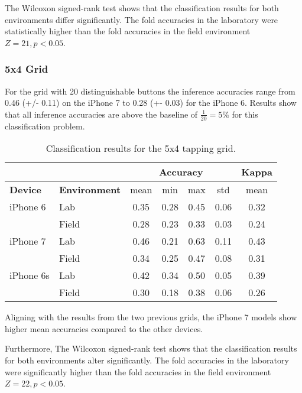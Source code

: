 The Wilcoxon signed-rank test shows that the classification results for both environments differ significantly. The fold accuracies in the laboratory were statistically higher than the fold accuracies in the field environment $Z = 21, p < 0.05$.

\subsubsection{5x4 Grid}
For the grid with 20 distinguishable buttons the inference accuracies range from 0.46 (+/- 0.11) on the iPhone 7 to 0.28 (+- 0.03) for the iPhone 6. Results show that all inference accuracies are above the baseline of $\frac{1}{20} = 5\%$ for this classification problem.

\begin{table}[h!]
  \centering
\begin{tabular}{|l|l|c|c|c|c|c|}
  \cline{3-7}
  \multicolumn{2}{c}{} & \multicolumn{4}{|c|}{\textbf{Accuracy}} & \textbf{Kappa} \\
  \hline
  \textbf{Device} & \textbf{Environment} & mean &   min &   max  & std &  mean \\
  \hline
  iPhone 6 & Lab &      0.35 &     0.28 &     0.45 &     0.06 &        0.32 \\
  & Field &      0.28 &     0.23 &     0.33 &     0.03 &        0.24 \\
  \hline
iPhone 7 & Lab &      0.46 &     0.21 &     0.63 &     0.11 &        0.43 \\
  & Field &      0.34 &     0.25 &     0.47 &     0.08 &        0.31 \\
  \hline
iPhone 6s & Lab &      0.42 &     0.34 &     0.50 &     0.05 &        0.39 \\
  & Field &      0.30 &     0.18 &     0.38 &     0.06 &        0.26 \\
  \hline
\end{tabular}
  \caption{Classification results for the 5x4 tapping grid.}
\end{table}

Aligning with the results from the two previous grids, the iPhone 7 models show higher mean accuracies compared to the other devices. 

Furthermore, The Wilcoxon signed-rank test shows that the classification results for both environments alter significantly. The fold accuracies in the laboratory were significantly higher than the fold accuracies in the field environment $Z = 22, p < 0.05$.

